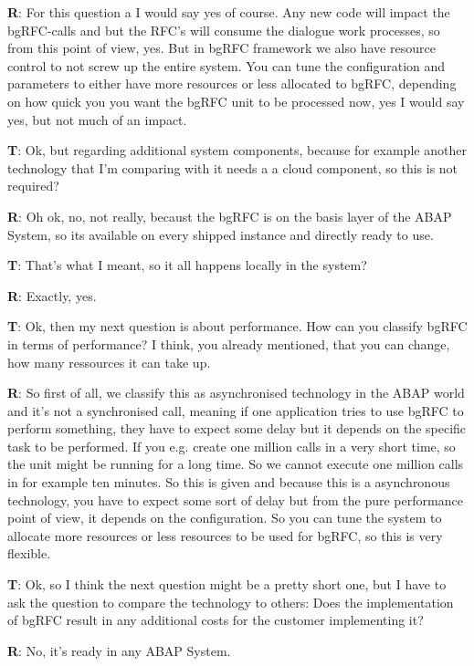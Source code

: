 \begin{list}{X:}{\setlength{\labelsep}{5mm}}
 \item[\textbf{R}:] For this question a I would say yes of course. Any new code will impact the bgRFC-calls and but the RFC's will consume the dialogue work processes, so from this point of view, yes. But in bgRFC framework we also have resource control to not screw up the entire system. You can tune the configuration and parameters to either have more resources or less allocated to bgRFC, depending on how quick you you want the bgRFC unit to be processed now, yes I would say yes, but not much of an impact.
 \item[\textbf{T}:] Ok, but regarding additional system components, because for example another technology that I'm comparing with it needs a a cloud component, so this is not required?
 \item[\textbf{R}:] Oh ok, no, not really, becaust the bgRFC is on the basis layer of the ABAP System, so its available on every shipped instance and directly ready to use.
 \item[\textbf{T}:] That's what I meant, so it all happens locally in the system?
 \item[\textbf{R}:] Exactly, yes.
 \item[\textbf{T}:] Ok, then my next question is about performance. How can you classify bgRFC in terms of performance? I think, you already mentioned, that you can change, how many ressources it can take up.
 \item[\textbf{R}:] So first of all, we classify this as asynchronised technology in the ABAP world and it's not a synchronised call, meaning if one application tries to use bgRFC to perform something, they have to expect some delay but it depends on the specific task to be performed. If you e.g. create one million calls in a very short time, so the unit might be running for a long time. So we cannot execute one million calls in for example ten minutes. So this is given and because this is a asynchronous technology, you have to expect some sort of delay but from the pure performance point of view, it depends on the configuration. So you can tune the system to allocate more resources or less resources to be used for bgRFC, so this is very flexible.
 \item[\textbf{T}:] Ok, so I think the next question might be a pretty short one, but I have to ask the question to compare the technology to others: Does the implementation of bgRFC result in any additional costs for the customer implementing it?
 \item[\textbf{R}:] No, it's ready in any ABAP System.

\end{list}
